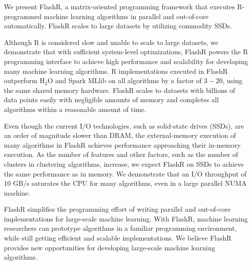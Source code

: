 We present FlashR, a matrix-oriented programming framework that executes
R-programmed machine learning algorithms in parallel and out-of-core
automatically. FlashR scales to large datasets by utilizing commodity SSDs.


Although R is considered slow and unable to scale to large datasets,
we demonstrate that with sufficient system-level optimizations, FlashR powers
the R programming interface to achieve high performance and scalability
for developing many machine learning algorithms. R implementations executed in FlashR
outperform H$_2$O and Spark MLlib on all algorithms by a factor of $3-20$, using
the same shared memory hardware. FlashR scales to datasets with billions of
data points easily with negligible amounts of memory and completes all
algorithms within a reasonable amount of time.

Even though the current I/O technologies, such as solid-state drives (SSDs),
are an order of magnitude slower than DRAM, the external-memory execution
of many algorithms in FlashR achieves performance approaching their in-memory
execution. As the number of features and other factors, such as the number of
clusters in clustering algorithms, increase, we expect FlashR on SSDs to achieve
the same performance as
in memory. We demonstrate that an I/O throughput of 10 GB/s saturates the CPU
for many algorithms, even in a large parallel NUMA machine. 

FlashR simplifies the programming effort of writing parallel and out-of-core
implementations for large-scale machine learning. With FlashR, machine learning
researchers can prototype algorithms in a familiar programming environment,
while still getting efficient and scalable implementations.
We believe FlashR provides new opportunities for developing large-scale
machine learning algorithms.
